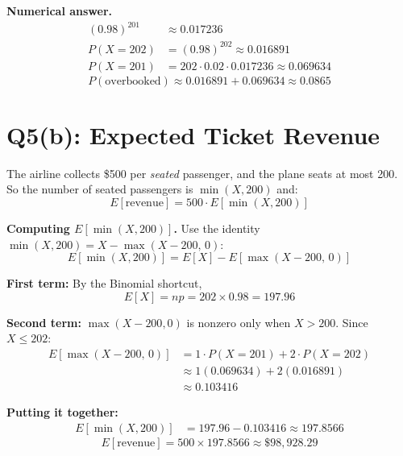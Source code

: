 \documentclass[12pt]{article}
\begin{document}
\textbf{Numerical answer.}
\begin{align*}
    (0.98)^{201} &\approx 0.017236 \\
    P(X = 202) &= (0.98)^{202} \approx 0.016891 \\
    P(X = 201) &= 202 \cdot 0.02 \cdot 0.017236 \approx 0.069634
\end{align*}
\[
    \boxed{P(\text{overbooked}) \approx 0.016891 + 0.069634 \approx 0.0865}
\]

\section*{Q5(b): Expected Ticket Revenue}

The airline collects \$500 per \textit{seated} passenger, and the plane seats at most 200. So the number of seated passengers is $\min(X, 200)$ and:
\[
    E[\text{revenue}] = 500 \cdot E[\min(X, 200)]
\]

\textbf{Computing $E[\min(X, 200)]$.} Use the identity $\min(X, 200) = X - \max(X - 200,\, 0)$:
\[
    E[\min(X, 200)] = E[X] - E[\max(X - 200,\, 0)]
\]

\textbf{First term:} By the Binomial shortcut,
\[
    E[X] = np = 202 \times 0.98 = 197.96
\]

\textbf{Second term:} $\max(X-200, 0)$ is nonzero only when $X > 200$. Since $X \leq 202$:
\begin{align*}
    E[\max(X-200,\, 0)] &= 1 \cdot P(X = 201) + 2 \cdot P(X = 202) \\
    &\approx 1(0.069634) + 2(0.016891) \\
    &\approx 0.103416
\end{align*}

\textbf{Putting it together:}
\begin{align*}
    E[\min(X, 200)] &= 197.96 - 0.103416 \approx 197.8566
\end{align*}
\[
    \boxed{E[\text{revenue}] = 500 \times 197.8566 \approx \$98{,}928.29}
\]
\end{document}
